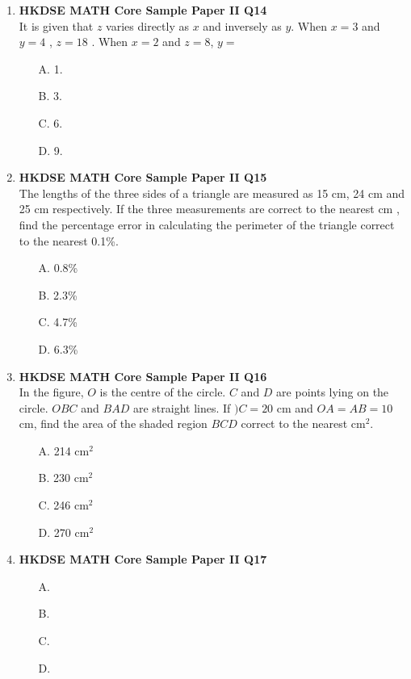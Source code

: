 \documentclass[12pt]{article}
\begin{document}
\begin{enumerate}
	\item \textbf{HKDSE MATH Core Sample Paper II Q14}\\
	It is given that $z$ varies directly as $x$ and inversely as $y$. When $x = 3$ and $y = 4$ , $z = 18$ . When $x = 2$ and $z = 8$, $y = $
	\begin{enumerate}
		\item[A.] 1.
		\item[B.] 3.
		\item[C.] 6.
		\item[D.] 9.
	\end{enumerate}

	\item \textbf{HKDSE MATH Core Sample Paper II Q15}\\
	The lengths of the three sides of a triangle are measured as 15 cm, 24 cm and 25 cm respectively. If the three measurements are correct to the nearest cm , find the percentage error in calculating the perimeter of the triangle correct to the nearest 0.1\%.
	\begin{enumerate}
		\item[A.] 0.8\%
		\item[B.] 2.3\%
		\item[C.] 4.7\%
		\item[D.] 6.3\%
	\end{enumerate}

	\item \textbf{HKDSE MATH Core Sample Paper II Q16}\\
	In the figure, $O$ is the centre of the circle. $C$ and $D$ are points lying on the circle. $OBC$ and $BAD$ are straight lines. If $)C = 20$ cm and $OA = AB = 10$ cm, find the area of the shaded region $BCD$ correct to the nearest cm$^2$.
	\begin{enumerate}
		\item[A.] 214 cm$^2$
		\item[B.] 230 cm$^2$
		\item[C.] 246 cm$^2$
		\item[D.] 270 cm$^2$
	\end{enumerate}

	\item \textbf{HKDSE MATH Core Sample Paper II Q17}\\
	
	\begin{enumerate}
		\item[A.]
		\item[B.]
		\item[C.]
		\item[D.]
	\end{enumerate}


\end{enumerate}
\end{document}

